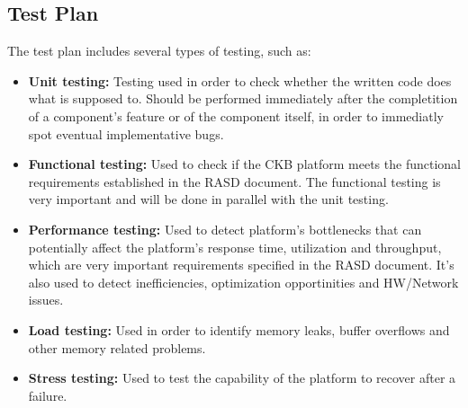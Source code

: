 \documentclass{article}
\begin{document}
{    \subsection{Test Plan}
        The test plan includes several types of testing, such as:
        \begin{itemize}
            \item \textbf{Unit testing:} Testing used in order to check whether the 
            written code does what is supposed to. Should be performed immediately after the
            completition of a component's feature or of the component itself, in order to 
            immediatly spot eventual implementative bugs.
            \item \textbf{Functional testing:} Used to check if the CKB platform meets the
            functional requirements established in the RASD document. The functional testing is very important 
            and will be done in parallel with the unit testing.
            \item \textbf{Performance testing:} Used to detect platform's bottlenecks that
            can potentially affect the platform's response time, utilization and throughput, which
            are very important requirements specified in the RASD document.
            It's also used to detect inefficiencies, optimization opportinities and HW/Network issues.
            \item \textbf{Load testing:} Used in order to identify memory leaks, buffer
            overflows and other memory related problems.
            \item \textbf{Stress testing:} Used to test the capability of the platform to 
            recover after a failure.
        \end{itemize}

\newpage
\pagestyle{EffortSpentStyle}
}
\end{document}

